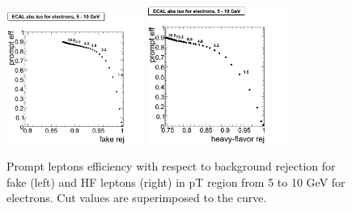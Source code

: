 \begin{figure}[htbp]
\begin{center}
 \includegraphics[width = 0.4\textwidth]{pictures/trackCut/bkgdRej_sigEff/elec_fake_ptCut0_ptCut1.png}
\includegraphics[width = 0.4\textwidth]{pictures/trackCut/bkgdRej_sigEff/elec_nonPrompt_ptCut0_ptCut1.png}
\caption{\small{Prompt leptons efficiency with respect to background 
rejection for fake (left) and HF leptons (right) in pT region
from 5 to 10 GeV for electrons. 
Cut values are superimposed to the curve.}\label{fig:ecalrej_el1}}
\end{center}
\end{figure}
